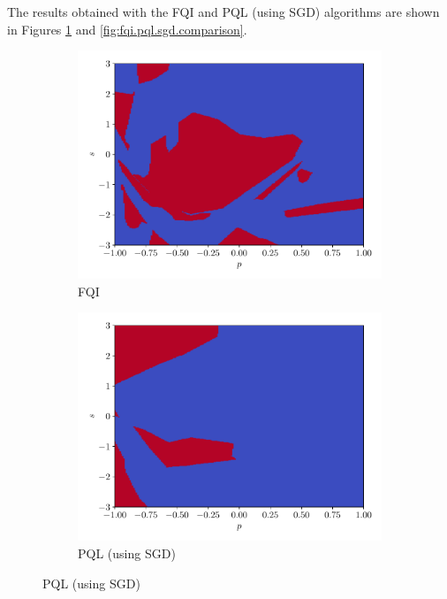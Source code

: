 \documentclass[a4paper, 12pt]{article}
\begin{document}
    The results obtained with the FQI and PQL (using SGD) algorithms are shown in Figures \ref{fig:fqi.pql.sgd.mu} and \ref{fig:fqi.pql.sgd.comparison}.
    
    \begin{figure}[h]
        \centering
        \begin{subfigure}{0.49\textwidth}
            \centering
            \includegraphics[width=\textwidth]{resources/pdf/5_mu_FQI.pdf}
            \caption{FQI}
        \end{subfigure}
        \hfill
        \begin{subfigure}{0.49\textwidth}
            \centering
            \includegraphics[width=\textwidth]{resources/pdf/5_mu_PQL_SGD.pdf}
            \caption{PQL (using SGD)}
        \end{subfigure}
        \label{fig:fqi.pql.sgd.mu}
    \end{figure}
    
\end{document}
